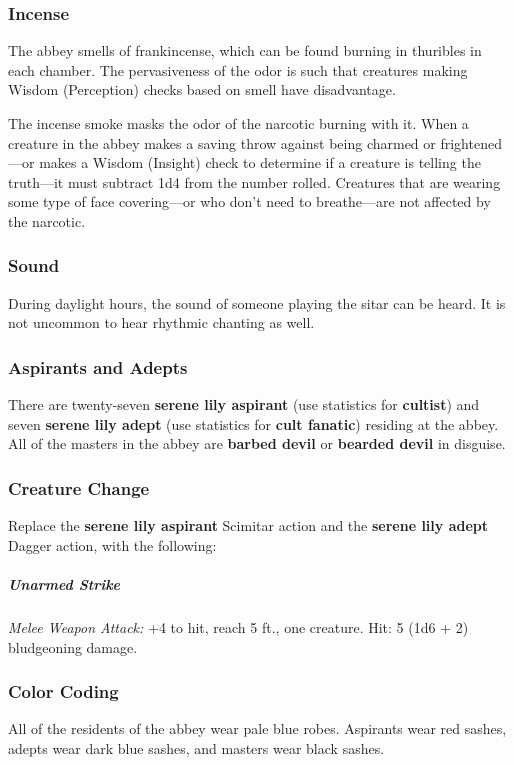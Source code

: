 \documentclass[10pt,a4paper,twoside,bg=print,twocolumn,openany,nodeprecatedcode]{dndbook}
\begin{document}
\subsubsection{Incense}
The abbey smells of frankincense, which can be found burning in thuribles in each chamber. The pervasiveness of the odor is such that creatures making Wisdom (Perception) checks based on smell have disadvantage.

The incense smoke masks the odor of the narcotic burning with it. When a creature in the abbey makes a saving throw against being charmed or frightened—or makes a Wisdom (Insight) check to determine if a creature is telling the truth—it must subtract 1d4 from the number rolled. Creatures that are wearing some type of face covering—or who don't need to breathe—are not affected by the narcotic.

\subsubsection{Sound}
During daylight hours, the sound of someone playing the sitar can be heard. It is not uncommon to hear rhythmic chanting as well.

\subsubsection{Aspirants and Adepts}
There are twenty-seven \textbf{serene lily aspirant} (use statistics for \textbf{cultist}) and seven \textbf{serene lily adept} (use statistics for \textbf{cult fanatic}) residing at the abbey. All of the masters in the abbey are \textbf{barbed devil} or \textbf{bearded devil} in disguise.

\subsubsection{Creature Change}
Replace the \textbf{serene lily aspirant} Scimitar action and the \textbf{serene lily adept} Dagger action, with the following:

\subparagraph{Unarmed Strike}
\textsl{Melee Weapon Attack:} +4 to hit, reach 5 ft., one creature. Hit: 5 (1d6 + 2) bludgeoning damage.

\subsubsection{Color Coding}
All of the residents of the abbey wear pale blue robes. Aspirants wear red sashes, adepts wear dark blue sashes, and masters wear black sashes.
\end{document}
